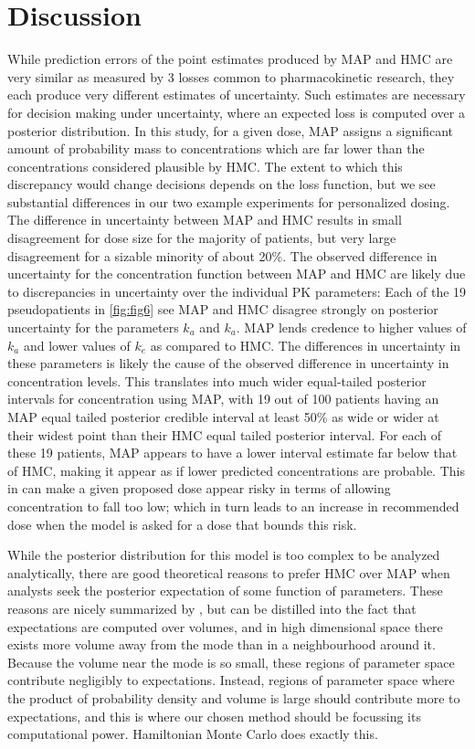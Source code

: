 \section{Discussion}

While prediction errors of the point estimates produced by MAP and HMC are very similar as measured by 3 losses common to pharmacokinetic research, they each produce very different estimates of uncertainty.  Such estimates are necessary for decision making under uncertainty, where an expected loss is computed over a posterior distribution.  In this study, for a given dose, MAP assigns a significant amount of probability mass to concentrations which are far lower than the concentrations considered plausible by HMC.  The extent to which this discrepancy would change decisions depends on the loss function, but we see substantial differences in our two example experiments for personalized dosing.  The difference in uncertainty between MAP and HMC results in small disagreement for dose size for the majority of patients, but very large disagreement for a sizable minority of about 20\%. The observed difference in uncertainty for the concentration function between MAP and HMC are likely due to discrepancies in uncertainty over the individual PK parameters: Each of the 19 pseudopatients in \cref{fig:fig6} see MAP and HMC disagree strongly on posterior uncertainty for the parameters $k_a$ and $k_a$.  MAP lends credence to higher values of $k_a$ and lower values of $k_e$ as compared to HMC. The differences in uncertainty in these parameters is likely the cause of the observed difference in uncertainty in concentration levels. This translates into much wider equal-tailed posterior intervals for concentration using MAP, with 19 out of 100 patients having an MAP equal tailed posterior credible interval at least 50\% as wide or wider at their widest point than their HMC equal tailed posterior interval. For each of these 19 patients, MAP appears to have a lower interval estimate far below that of HMC, making it appear as if lower predicted concentrations are probable. This in can make a given proposed dose appear risky in terms of allowing concentration to fall too low; which in turn leads to an increase in recommended dose when the model is asked for a dose that bounds this risk.

While the posterior distribution for this model is too complex to be analyzed analytically, there are good theoretical reasons to prefer HMC over MAP when analysts seek the posterior expectation of some function of parameters. These reasons are nicely summarized by \cite{Betancourt2017-ak}, but can be distilled into the fact that expectations are computed over volumes, and in high dimensional space there exists more volume away from the mode than in a neighbourhood around it. Because the volume near the mode is so small, these regions of parameter space contribute negligibly to expectations.  Instead, regions of parameter space where the product of probability density and volume is large should contribute more to expectations, and this is where our chosen method should be focussing its computational power.  Hamiltonian Monte Carlo does exactly this.

